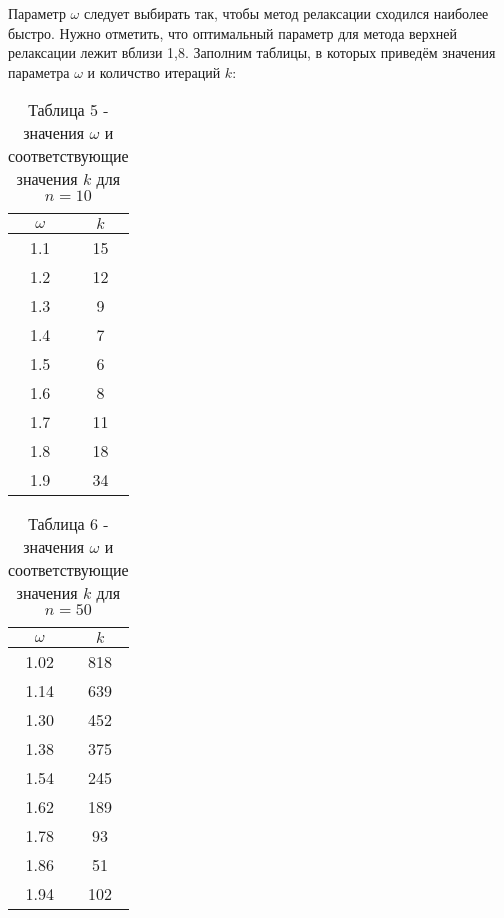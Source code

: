 \documentclass[a4paper,12pt]{article}
\begin{document}
{Параметр $\omega$ следует выбирать так, чтобы метод релаксации сходился наиболее быстро. 
Нужно отметить, что оптимальный параметр для метода верхней релаксации лежит вблизи 1,8. 
Заполним таблицы, в которых приведём значения параметра $\omega$ и количство итераций $k$:
\begin{table}[h]
    \centering
    \begin{tabular}{|c|c|}
        \hline
        $\omega$ & $k$\\
        \hline
        1.1 & 15\\ \hline
        1.2 & 12\\ \hline
        1.3 & 9\\ \hline
        1.4 & 7\\ \hline
        1.5 & 6\\ \hline
        1.6 & 8\\ \hline
        1.7 & 11\\ \hline
        1.8 & 18\\ \hline
        1.9 & 34\\ \hline
    \end{tabular}
    \caption*{\small{Таблица 5 - значения $\omega$ и соответствующие значения $k$ для $n = 10$}}
\end{table}
\clearpage
\begin{table}[h]
    \centering
    \begin{tabular}{|c|c|}
        \hline
        $\omega$ & $k$\\
        \hline
        1.02 &  818\\ \hline
        1.14 &  639\\ \hline
        1.30 &  452\\ \hline
        1.38 &  375\\ \hline
        1.54 &  245\\ \hline
        1.62 &  189\\ \hline
        1.78 &  93\\ \hline
        1.86 &  51\\ \hline
        1.94 &  102\\ \hline
    \end{tabular}
    \caption*{\small{Таблица 6 - значения $\omega$ и соответствующие значения $k$ для $n = 50$}}
\end{table}

}
\end{document}
